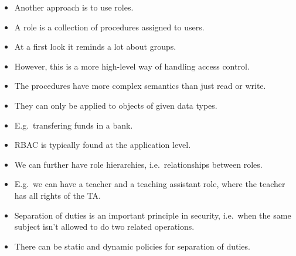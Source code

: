 \begin{frame}
  \begin{itemize}
    \item Another approach is to use roles.

    \item A role is a collection of procedures assigned to users.

    \item At a first look it reminds a lot about groups.

    \item However, this is a more high-level way of handling access control.

  \end{itemize}
\end{frame}

\begin{frame}
  \begin{itemize}
    \item The procedures have more complex semantics than just read or write.

    \item They can only be applied to objects of given data types.

    \item E.g.\ transfering funds in a bank.

    \item RBAC is typically found at the application level.
  \end{itemize}
\end{frame}

\begin{frame}
  \begin{itemize}
    \item We can further have role hierarchies, i.e.\ relationships between 
      roles.

    \item E.g.\ we can have a teacher and a teaching assistant role, where the 
      teacher has all rights of the TA\@.

    \item Separation of duties is an important principle in security, i.e.\ 
      when the same subject isn't allowed to do two related operations.

    \item There can be static and dynamic policies for separation of duties.

  \end{itemize}
\end{frame}

